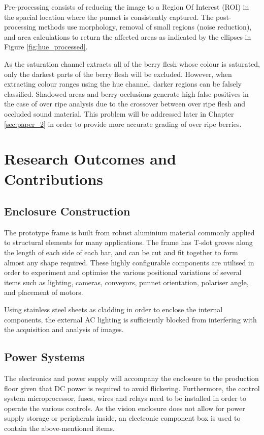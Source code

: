 \documentclass[fleqn,twoside,12pt]{report}
\begin{document}
Pre-processing consists of reducing the image to a Region Of Interest (ROI) in the spacial location where the punnet is consistently captured. The post-processing methods use morphology, removal of small regions (noise reduction), and area calculations to return the affected areas as indicated by the ellipses in Figure \ref{fig:hue_processed}.


As the saturation channel extracts all of the berry flesh whose colour is saturated, only the darkest parts of the berry flesh will be excluded. However, when extracting colour ranges using the hue channel, darker regions can be falsely classified. Shadowed areas and berry occlusions generate high false positives in the case of over ripe analysis due to the crossover between over ripe flesh and occluded sound material. This problem will be addressed later in Chapter \ref{sec:paper_2} in order to provide more accurate grading of over ripe berries. 


\section{Research Outcomes and Contributions}


\subsection{Enclosure Construction}

The prototype frame is built from robust aluminium material commonly applied to structural elements for many applications. The frame has T-slot groves along the length of each side of each bar, and can be cut and fit together to form almost any shape required. These highly configurable components are utilised in order to experiment and optimise the various positional variations of several items such as lighting, cameras, conveyors, punnet orientation, polariser angle, and placement of motors. 

Using stainless steel sheets as cladding in order to enclose the internal components, the external AC lighting is sufficiently blocked from interfering with the acquisition and analysis of images.   



\subsection{Power Systems}
\label{sec:electronic_power}

The electronics and power supply will accompany the enclosure to the production floor given that DC power is required to avoid flickering. Furthermore, the control system microprocessor, fuses, wires and relays need to be installed in order to operate the various controls. As the vision enclosure does not allow for power supply storage or peripherals inside, an electronic component box is used to contain the above-mentioned items. 
\end{document}
